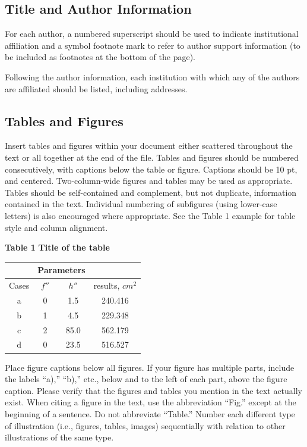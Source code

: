 \documentclass{jafm}
\begin{document}
\subsection{Title and Author Information}
For each author, a numbered superscript should be used to indicate institutional affiliation and a symbol footnote mark to refer to author support information (to be included as footnotes at the bottom of the page). 

Following the author information, each institution with which any of the authors are affiliated should be listed, including addresses.
\subsection{Tables and Figures}
Insert tables and figures within your document either scattered throughout the text or all together at the end of the file. Tables and figures should be numbered consecutively, with captions below the table or figure. Captions should be 10 pt, and centered. Two-column-wide figures and tables may be used as appropriate. Tables should be self-contained and complement, but not duplicate, information contained in the text. Individual numbering of subfigures (using lower-case letters) is also encouraged where appropriate. See the Table 1 example for table style and column alignment. 
\begin{center}
\textbf{Table 1 }\textbf{Title of the table}\textbf{}
\begin{tabular}{|c|c|c|c|} \hline
 & \multicolumn{2}{|c|}{ Parameters} & \\ \hline
Cases & $f''$ & $h''$ & results, $cm^2$ \\ \hline
a  & 0  & 1.5  & 240.416  \\ \cline{1-3}
b  & 1  & 4.5  & 229.348  \\ \cline{1-3}
c  & 2  & 85.0  & 562.179  \\ \cline{1-3}
d  & 0  & 23.5  & 516.527  \\ \hline
\end{tabular}
\end{center}
Place figure captions below all figures. If your figure has multiple parts, include the labels ``a),'' ``b),'' etc., below and to the left of each part, above the figure caption. Please verify that the figures and tables you mention in the text actually exist. When citing a figure in the text, use the abbreviation ``Fig.'' except at the beginning of a sentence. Do not abbreviate ``Table.'' Number each different type of illustration (i.e., figures, tables, images) sequentially with relation to other illustrations of the same type.
\end{document}
